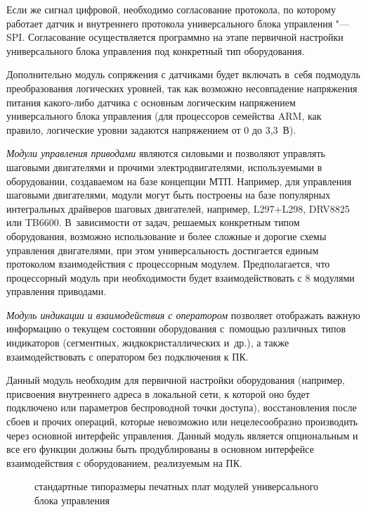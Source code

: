 Если же сигнал цифровой, необходимо согласование протокола, по которому работает датчик и внутреннего протокола универсального блока управления "--- \foreignlanguage{english}{SPI}. Согласование осуществляется программно на этапе первичной настройки универсального блока управления под конкретный тип оборудования.

Дополнительно модуль сопряжения с датчиками будет включать в~себя подмодуль преобразования логических уровней, так как возможно несовпадение напряжения питания какого-либо датчика с основным логическим напряжением универсального блока управления (для процессоров семейства \foreignlanguage{english}{ARM}, как правило, логические уровни задаются напряжением от 0 до 3,3~В).

\textit{Модули управления приводами} являются силовыми и позволяют управлять шаговыми двигателями и прочими электродвигателями, используемыми в оборудовании, создаваемом на базе концепции \foreignlanguage{english}{МТП}. Например, для управления шаговыми двигателями, модули могут быть построены на базе популярных интегральных драйверов шаговых двигателей, например, \foreignlanguage{english}{L}297+\foreignlanguage{english}{L}298, \foreignlanguage{english}{DRV}8825 или \foreignlanguage{english}{TB}6600. В~зависимости от задач, решаемых конкретным типом оборудования, возможно использование и более сложные и дорогие схемы управления двигателями, при этом универсальность достигается единым протоколом взаимодействия с процессорным модулем. Предполагается, что процессорный модуль при необходимости будет взаимодействовать с 8 модулями управления приводами.

\textit{Модуль индикации и взаимодействия с оператором} позволяет отображать важную информацию о текущем состоянии оборудования с~помощью различных типов индикаторов (сегментных, жидкокристаллических и~др.), а также взаимодействовать с оператором без подключения к ПК.

Данный модуль необходим для первичной настройки оборудования (например, присвоения внутреннего адреса в локальной сети, к которой оно будет подключено или параметров беспроводной точки доступа), восстановления после сбоев и прочих операций, которые невозможно или нецелесообразно производить через основной интерфейс управления. Данный модуль является опциональным и все его функции должны быть продублированы в основном интерфейсе взаимодействия с оборудованием, реализуемым на ПК.

\begin{figure}[ht]
	\caption{стандартные типоразмеры печатных плат модулей универсального блока управления}\label{fig:euromech}
\end{figure}

